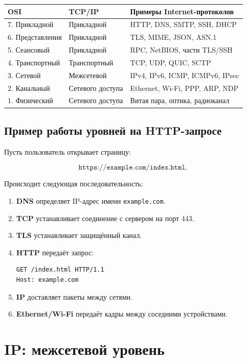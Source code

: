 \documentclass[12pt,a4paper]{article}
\begin{document}
\begin{center}
\begin{tabular}{|p{4cm}|p{4cm}|p{6cm}|}
\hline
\textbf{OSI} & \textbf{TCP/IP} & \textbf{Примеры Internet-протоколов} \\
\hline
7. Прикладной & Прикладной & HTTP, DNS, SMTP, SSH, DHCP \\
\hline
6. Представления & Прикладной & TLS, MIME, JSON, ASN.1 \\
\hline
5. Сеансовый & Прикладной & RPC, NetBIOS, части TLS/SSH \\
\hline
4. Транспортный & Транспортный & TCP, UDP, QUIC, SCTP \\
\hline
3. Сетевой & Межсетевой & IPv4, IPv6, ICMP, ICMPv6, IPsec \\
\hline
2. Канальный & Сетевого доступа & Ethernet, Wi-Fi, PPP, ARP, NDP \\
\hline
1. Физический & Сетевого доступа & Витая пара, оптика, радиоканал \\
\hline
\end{tabular}
\end{center}

\subsection{Пример работы уровней на HTTP-запросе}

Пусть пользователь открывает страницу:

\[
\texttt{https://example.com/index.html}.
\]

Происходит следующая последовательность:

\begin{enumerate}
    \item \textbf{DNS} определяет IP-адрес имени \texttt{example.com}.
    \item \textbf{TCP} устанавливает соединение с сервером на порт 443.
    \item \textbf{TLS} устанавливает защищённый канал.
    \item \textbf{HTTP} передаёт запрос:
\begin{lstlisting}
GET /index.html HTTP/1.1
Host: example.com
\end{lstlisting}
    \item \textbf{IP} доставляет пакеты между сетями.
    \item \textbf{Ethernet/Wi-Fi} передаёт кадры между соседними устройствами.
\end{enumerate}

\section{IP: межсетевой уровень}
\end{document}
